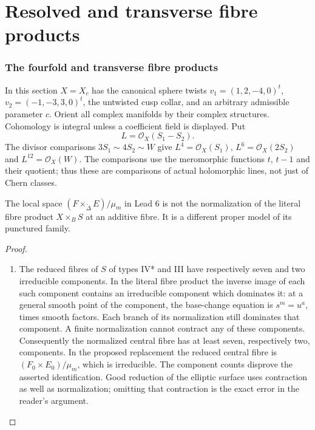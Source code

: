 \part{Resolved and transverse fibre products}
\section{The fourfold and transverse fibre products}

In this section $X=X_c$ has the canonical sphere twists
$v_1=(1,2,-4,0)^t$, $v_2=(-1,-3,3,0)^t$, the untwisted cusp collar,
and an arbitrary admissible parameter $c$.  Orient all complex manifolds by
their complex structures.  Cohomology is integral unless a coefficient
field is displayed.  Put
\[
 L=\mathcal O_X(S_1-S_2).
\]
The divisor comparisons $3S_1\sim4S_2\sim W$ give
$L^4=\mathcal O_X(S_1)$, $L^6=\mathcal O_X(2S_2)$ and
$L^{12}=\mathcal O_X(W)$.  The comparisons use the meromorphic functions
$t$, $t-1$ and their quotient; thus these are comparisons of actual
holomorphic lines, not just of Chern classes.

\begin{proposition}\label{maps:src:E.1.1}


The local space $(F\times_{\widetilde\Delta}E)/\mu_m$ in Lead 6 is not
the normalization of the literal fibre product $X\times_B S$ at an
additive fibre.  It is a different proper model of its punctured family.

\end{proposition}


\begin{proof}
\begin{enumerate}[label=\arabic*.,leftmargin=*]
\item The reduced fibres of $S$ of types IV* and III have respectively seven
and two irreducible components.  In the literal fibre product the inverse
image of each such component contains an irreducible component which
dominates it: at a general smooth point of the component, the base-change
equation is $s^m=u^a$, times smooth factors.  Each branch of its
normalization still dominates that component.  A finite normalization
cannot contract any of these components.  Consequently the normalized
central fibre has at least seven, respectively two, components.  In the
proposed replacement the reduced central fibre is
$(F_0\times E_0)/\mu_m$, which is irreducible.  The component counts
disprove the asserted identification.  Good reduction of the elliptic
surface uses contraction as well as normalization; omitting that
contraction is the exact error in the reader's argument.
\end{enumerate}
\end{proof}

